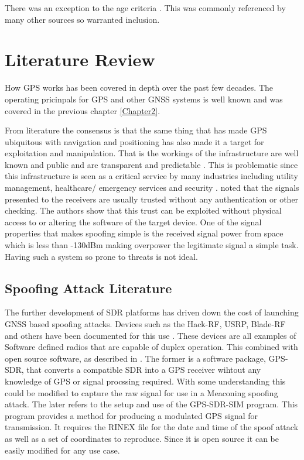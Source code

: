 There was an exception to the age criteria \cite{RN11}. This was commonly referenced by many other sources so warranted inclusion. 


\section{Literature Review}
How GPS works has been covered in depth over the past few decades. The operating pricinpals for GPS and other GNSS systems is well known and was covered in the previous
chapter \ref{Chapter2}.

From literature the consensus is that the same thing that has made GPS ubiquitous with navigation and 
positioning has also made it a target for exploitation and manipulation. That is the workings
of the infrastructure are well known and public and are transparent and predictable \cite{RN7} \cite{RN4}. This is problematic since this infrastructure
is seen as a critical service by many industries including utility management, healthcare/ emergency services and security \cite{RN12} \cite{RN32}. \textcite{RN28} noted that the signals
presented to the receivers are usually trusted without any authentication or other checking. The authors show that this trust can be exploited without physical access to
or altering the software of the target device. One of the signal properties that makes spoofing simple is the received signal power from space which is less than -130dBm
making overpower the legitimate signal a simple task. Having such a system so prone to threats is not ideal. 

%
%

\subsection{Spoofing Attack Literature} \label{Subsec:SpoofLit}
The further development of SDR platforms has driven down the cost of launching GNSS based spoofing attacks. Devices such as the Hack-RF, USRP, Blade-RF and others have
been documented for this use \cite{RN4} \cite{RN9}. These devices are all examples of Software defined radios that are capable of duplex operation. This combined with
open source software, as described in \cite{RN16} \cite{RN57} \cite{RN4}. The former is a software package, GPS-SDR, that converts a compatible SDR into a GPS receiver
wihtout any knowledge of GPS or signal procssing required. With some understanding this could be modified to capture the raw signal for use in a Meaconing spoofing
attack. The later refers to the setup and use of the GPS-SDR-SIM program. This program provides a method for producing a modulated GPS signal for transmission. It
requires the RINEX file for the date and time of the spoof attack as well as a set of coordinates to reproduce. Since it is open source it can be easily modified for any
use case. 

